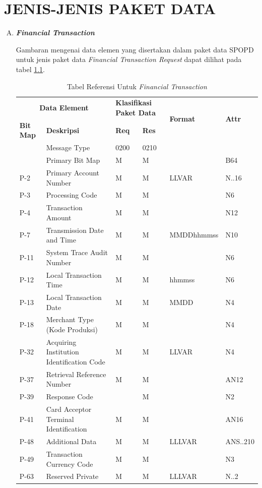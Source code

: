 \chapter{JENIS-JENIS PAKET DATA}

\begin{enumerate}[A.]

  \item \textbf{\textit{Financial Transaction}}
  
  Gambaran mengenai data elemen yang disertakan dalam paket data SPOPD untuk jenis paket data \textit{Financial Transaction Request} dapat dilihat pada tabel \ref{tab:fin-trans}.
  
\begin{table}[H]
  \centering
  \scriptsize
  \begin{tabular}{|p{3em}|p{10em}|p{3em}|p{3em}|l|l|}
  \hline
  \multicolumn{2}{|c|}{\textbf{Data Element}} & \multicolumn{2}{|p{6em}|}{\textbf{Klasifikasi Paket Data}} & \multirow{2}{*}{\textbf{Format}} & \multirow{2}{*}{\textbf{Attr}} \\
  \cline{1-4}
  \textbf{Bit Map} & \textbf{Deskripsi} & \textbf{Req} & \textbf{Res} &  & \\
  \hline
  \hline
  & Message Type & 0200 & 0210 & & \\
  \hline
  & Primary Bit Map & M & M & & B64 \\
  \hline
  P-2 & Primary Account Number & M & M & LLVAR & N..16 \\
  \hline
  P-3 & Processing Code & M & M & & N6 \\
  \hline
  P-4 & Transaction Amount & M & M & & N12 \\
  \hline
  P-7 & Transmission Date and Time & M & M & MMDDhhmmss & N10 \\
  \hline
  P-11 & System Trace Audit Number & M & M & & N6 \\
  \hline
  P-12 & Local Transaction Time & M & M & hhmmss & N6 \\
  \hline
  P-13 & Local Transaction Date & M & M & MMDD & N4 \\
  \hline
  P-18 & Merchant Type (Kode Produksi) & M & M & & N4 \\
  \hline
  P-32 & Acquiring Institution Identification Code & M & M & LLVAR & N4 \\
  \hline
  P-37 & Retrieval Reference Number & M & M & & AN12 \\
  \hline
  P-39 & Response Code & & M & & N2 \\
  \hline
  P-41 & Card Acceptor Terminal Identification & M & M & & AN16 \\
  \hline
  P-48 & Additional Data & M & M & LLLVAR & ANS..210 \\
  \hline
  P-49 & Transaction Currency Code & M & M & & N3 \\
  \hline
  P-63 & Reserved Private & M & M & LLLVAR & N..2 \\
  \hline
  \end{tabular}
  \caption{Tabel Referensi Untuk \textit{Financial Transaction}}
  \label{tab:fin-trans}
\end{table}
  

\end{enumerate}
